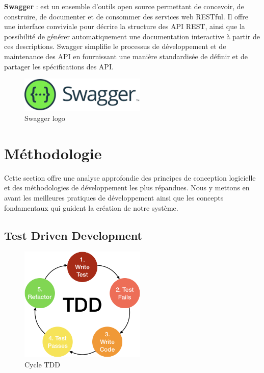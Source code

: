 \textbf{Swagger} : est un ensemble d'outils open source permettant de concevoir, de construire, de documenter et de consommer des services web RESTful. Il offre une interface conviviale pour décrire la structure des API REST, ainsi que la possibilité de générer automatiquement une documentation interactive à partir de ces descriptions. Swagger simplifie le processus de développement et de maintenance des API en fournissant une manière standardisée de définir et de partager les spécifications des API.
\\
\begin{figure}[H]
    \centering
    \includegraphics[width=6cm]{Figures/swaggerlogo.png}
    \caption{Swagger logo}
\end{figure}






\section{Méthodologie}

Cette section offre une analyse approfondie des principes de conception logicielle et des méthodologies de développement les plus répandues. Nous y mettons en avant les meilleures pratiques de développement ainsi que les concepts fondamentaux qui guident la création de notre système.

\subsection{Test Driven Development}


\begin{figure}[H]
    \centering
    \includegraphics[width=6cm]{Figures/TDD.png}
    \caption{Cycle TDD}
\end{figure}



